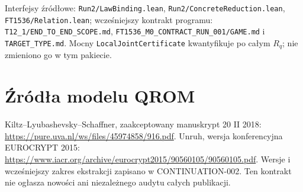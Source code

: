 \documentclass[11pt,a4paper]{article}
\newcommand{\code}[1]{\nolinkurl{#1}}
\begin{document}
Interfejsy źródłowe: \code{Run2/LawBinding.lean},
\code{Run2/ConcreteReduction.lean}, \code{FT1536/Relation.lean};
wcześniejszy kontrakt programu: \code{T12_1/END_TO_END_SCOPE.md},
\code{FT1536_M0_CONTRACT_RUN_001/GAME.md} i \code{TARGET_TYPE.md}.
Mocny \code{LocalJointCertificate} kwantyfikuje po całym $R_q$;
nie zmieniono go w tym pakiecie.

\section{Źródła modelu QROM}
Kiltz--Lyubashevsky--Schaffner, zaakceptowany manuskrypt 20 II 2018:
\url{https://pure.uva.nl/ws/files/45974858/916.pdf}.
Unruh, wersja konferencyjna EUROCRYPT 2015:
\url{https://www.iacr.org/archive/eurocrypt2015/90560105/90560105.pdf}.
Wersje i wcześniejszy zakres ekstrakcji zapisano w CONTINUATION-002.
Ten kontrakt nie ogłasza nowości ani niezależnego audytu całych publikacji.
\end{document}
